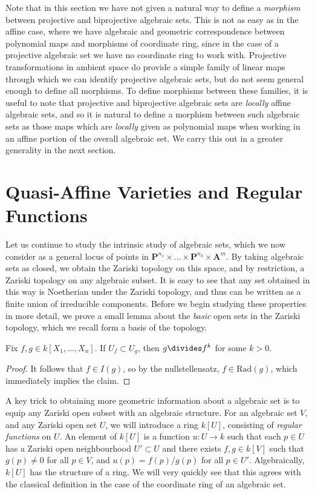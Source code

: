Note that in this section we have not given a natural way to define a \emph{morphism} between projective and biprojective algebraic sets. This is not as easy as in the affine case, where we have algebraic and geometric correspondence between polynomial maps and morphisms of coordinate ring, since in the case of a projective algebraic set we have no coordinate ring to work with. Projective transformations in ambient space do provide a simple family of linear maps through which we can identify projective algebraic sets, but do not seem general enough to define all morphisms. To define morphisms between these families, it is useful to note that projective and biprojective algebraic sets are \emph{locally} affine algebraic sets, and so it is natural to define a morphism between such algebraic sets as those maps which are \emph{locally} given as polynomial maps when working in an affine portion of the overall algebraic set. We carry this out in a greater generality in the next section.

\section{Quasi-Affine Varieties and Regular Functions}

Let us continue to study the intrinsic study of algebraic sets, which we now consider as a general locus of points in $\mathbf{P}^{n_1} \times \dots \times \mathbf{P}^{n_k} \times \mathbf{A}^m$. By taking algebraic sets as closed, we obtain the Zariski topology on this space, and by restriction, a Zariski topology on any algebraic subset. It is easy to see that any set obtained in this way is Noetherian under the Zariski topology, and thus can be written as a finite union of irreducible components. Before we begin studying these properties in more detail, we prove a small lemma about the \emph{basic} open sets in the Zariski topology, which we recall form a basis of the topology.

\begin{lemma}
    Fix $f,g \in k[X_1,\dots,X_n]$. If $U_f \subset U_g$, then $g \divides f^k$ for some $k > 0$.
\end{lemma}
\begin{proof}
    It follows that $f \in I(g)$, so by the nullstellensatz, $f \in \text{Rad}(g)$, which immediately implies the claim.
\end{proof}

A key trick to obtaining more geometric information about a algebraic set is to equip any Zariski open subset with an algebraic structure. For an algebraic set $V$, and any Zariski open set $U$, we will introduce a ring $k[U]$, consisting of \emph{regular functions} on $U$. An element of $k[U]$ is a function $u: U \to k$ such that each $p \in U$ has a Zariski open neighbourhood $U' \subset U$ and there exists $f,g \in k[V]$ such that $g(p) \neq 0$ for all $p \in V$, and $u(p) = f(p)/g(p)$ for all $p \in U'$. Algebraically, $k[U]$ has the structure of a ring. We will very quickly see that this agrees with the classical definition in the case of the coordinate ring of an algebraic set.

